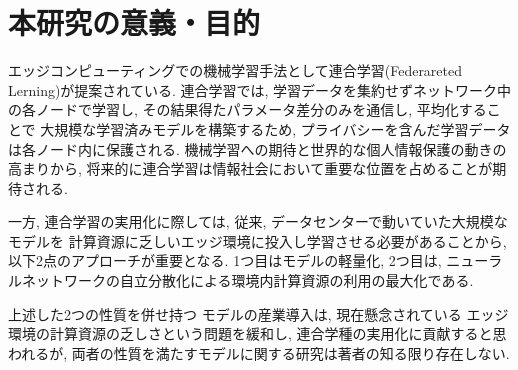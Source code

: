 \documentclass[a4paper,9pt,twocolumn]{jsarticle}
\begin{document}


\graphicspath{{./figs/}} %

\section{本研究の意義・目的}

エッジコンピューティングでの機械学習手法として連合学習(Federareted Lerning)が提案されている\cite{DFL}.
連合学習では, 学習データを集約せずネットワーク中の各ノードで学習し, 
その結果得たパラメータ差分のみを通信し, 平均化することで
大規模な学習済みモデルを構築するため, プライバシーを含んだ学習データは各ノード内に保護される.
機械学習への期待と世界的な個人情報保護の動きの高まりから, 
将来的に連合学習は情報社会において重要な位置を占めることが期待される.

一方, 連合学習の実用化に際しては, 
従来, データセンターで動いていた大規模なモデルを
計算資源に乏しいエッジ環境に投入し学習させる必要があることから,  
以下2点のアプローチが重要となる.
1つ目はモデルの軽量化, 
2つ目は, ニューラルネットワークの自立分散化による環境内計算資源の利用の最大化である.

上述した2つの性質を併せ持つ
モデルの産業導入は, 現在懸念されている
エッジ環境の計算資源の乏しさという問題を緩和し, 
連合学種の実用化に貢献すると思われるが, 
両者の性質を満たすモデルに関する研究は著者の知る限り存在しない.
\end{document}
